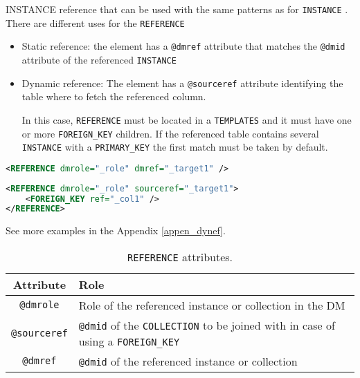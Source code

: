 INSTANCE reference that can be used with the same patterns as for \texttt{INSTANCE} .
There are different uses for the \texttt{REFERENCE} 

\begin{itemize}
    \item Static reference: the element has a \texttt{@dmref} attribute that matches the \texttt{@dmid} attribute of the referenced \texttt{INSTANCE} 
    \item Dynamic reference: The element has a \texttt{@sourceref} attribute identifying  the table where to fetch the referenced column. 
    
             In this case, \texttt{REFERENCE} must be located in a \texttt{TEMPLATES} and it must have one or more \texttt{FOREIGN\_KEY} children. 
             If the referenced table contains several \texttt{INSTANCE} with a \texttt{PRIMARY\_KEY}  the first match must be taken by default.
\end{itemize}

\begin{lstlisting}[caption={Simple \texttt{REFERENCE}, to be replaced with the \texttt{INSTANCE} having \texttt{@dmid} \_target1.},language=XML]
<REFERENCE dmrole="_role" dmref="_target1" />
\end{lstlisting}

\begin{lstlisting}[caption={Dynamic \texttt{REFERENCE}, to be replaced with the \texttt{INSTANCE} of the table of collection \_target1 and having a \texttt{PRIMARY\_KEY} matching the value of column  \_col1. This pattern is valid in the context of a TEMPLATES.},language=XML]
<REFERENCE dmrole="_role" sourceref="_target1">
    <FOREIGN_KEY ref="_col1" />
</REFERENCE>
\end{lstlisting}

See more examples in the Appendix \ref{appen_dynef}. 

\begin{table}[!htbp]
\small
\centering
\begin{tabulary}{\linewidth}{|c|J|}       
       \hline 
            \textbf{Attribute} & 
            \textbf {Role}\\
       \hline         \hline  
            \texttt{@dmrole} & 
            Role of the referenced instance or collection in the DM \\
        \hline 
            \texttt{@sourceref}  &
            \texttt{@dmid} of the \texttt{COLLECTION} to be joined with in case of using a \texttt{FOREIGN\_KEY} \\
        \hline 
            \texttt{@dmref} & 
            \texttt{@dmid} of the referenced instance or collection\\
        \hline 
     \end{tabulary}
     \caption{\texttt{REFERENCE} attributes.} 
     \label{tbl:reference-att}
 \end{table}

